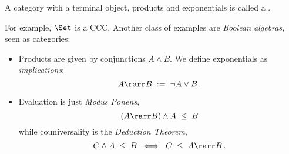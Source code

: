 \documentclass[12pt]{article}
\begin{document}
\begin{mydefinition}%
A category with a terminal object, products and exponentials is called a . \deq
\end{mydefinition}
%
For example, $\Set$ is a CCC. Another class of examples are \emph{Boolean algebras}, seen as categories:
\begin{itemize}
  \item Products are given by conjunctions $A \wedge B$. We define exponentials as \emph{implications}:
    \[ A \rarr B \; := \; \neg A \vee B\,. \]
  \item Evaluation is just \emph{Modus Ponens},
    \[ (A \rarr B) \wedge A \;\leq\; B \]
    while couniversality is the \emph{Deduction Theorem},
    \[ C \wedge A \;\leq\; B \;\; \Longleftrightarrow \;\; C \;\leq\; A \rarr B\,. \]
\end{itemize}
\end{document}
